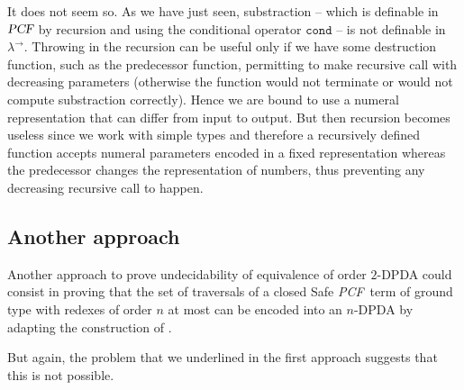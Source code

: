 \documentclass{article}
\newcommand{\encode}[1]{\ulcorner #1 \urcorner}
\newcommand{\nat}{\mathbb{N}}
\newcommand{\betared}{\rightarrow_\beta}
\newcommand\pcf{\textsl{PCF}}
\newcommand\pcfcond{\texttt{cond}}
\begin{document}
It does not seem so. As we have just seen, substraction -- which is definable in $\pcf$  by recursion and using the conditional operator $\pcfcond$ -- is not definable in $\lambda^\rightarrow$. Throwing in the recursion
can  be useful only if we have some destruction function, such as the predecessor function, permitting to make recursive call with decreasing parameters (otherwise the function would not terminate or would not compute substraction correctly). Hence we are bound to use a numeral representation
that can differ from input to output. But then recursion becomes useless since we work with simple types and therefore a recursively defined function accepts numeral parameters encoded in a fixed representation whereas the predecessor changes the representation of numbers, thus preventing any decreasing recursive call to happen.

%
%
%

\subsection{Another approach}

Another approach to prove undecidability of equivalence of order $2$-DPDA could consist in proving that the set of traversals of a closed Safe \pcf\ term of ground type with redexes of order $n$ at most can be encoded into an $n$-DPDA by adapting the construction of \cite{KNU02}. 

But again, the problem that we underlined in the first approach suggests  that this is not possible. 



\end{document}
